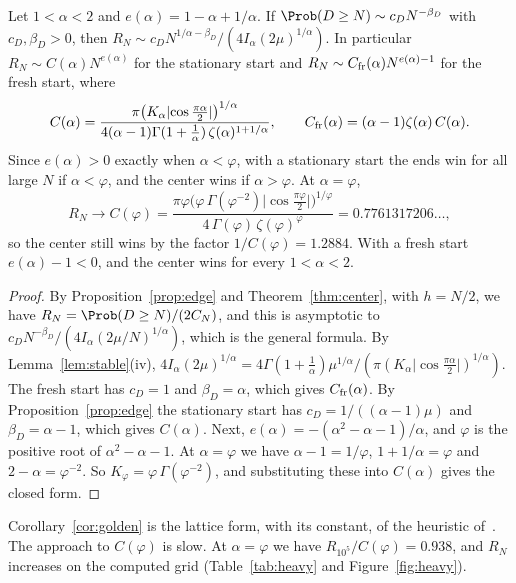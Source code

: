 \begin{corollary}\label{cor:golden}
Let $1<\alpha<2$ and $e(\alpha)=1-\alpha+1/\alpha$. If
$\Prob(D\ge N)\sim c_DN^{-\beta_D}$ with $c_D,\beta_D>0$, then
$R_N\sim c_DN^{1/\alpha-\beta_D}/(4I_\alpha(2\mu)^{1/\alpha})$. In particular
$R_N\sim C(\alpha)N^{e(\alpha)}$ for the stationary start and
$R_N\sim C_{\rm fr}(\alpha)N^{e(\alpha)-1}$ for the fresh start, where
\[
 C(\alpha)=\frac{\pi\bigl(K_\alpha\lvert\cos\frac{\pi\alpha}2\rvert
 \bigr)^{1/\alpha}}{4(\alpha-1)\Gamma(1+\frac1\alpha)\,
 \zeta(\alpha)^{1+1/\alpha}},\qquad
 C_{\rm fr}(\alpha)=(\alpha-1)\zeta(\alpha)\,C(\alpha).
\]
Since $e(\alpha)>0$ exactly when $\alpha<\varphi$, with a stationary start the
ends win for all large $N$ if $\alpha<\varphi$, and the center wins if
$\alpha>\varphi$. At $\alpha=\varphi$,
\[
 R_N\to C(\varphi)=\frac{\pi\varphi\bigl(\varphi\,\Gamma(\varphi^{-2})\lvert
 \cos\frac{\pi\varphi}2\rvert\bigr)^{1/\varphi}}{4\,\Gamma(\varphi)\,
 \zeta(\varphi)^{\varphi}}=0.7761317206\ldots,
\]
so the center still wins by the factor $1/C(\varphi)=1.2884$. With a fresh
start $e(\alpha)-1<0$, and the center wins for every $1<\alpha<2$.
\end{corollary}

\begin{proof}
By Proposition~\ref{prop:edge} and Theorem~\ref{thm:center}, with $h=N/2$, we
have $R_N=\Prob(D\ge N)/(2C_N)$, and this is asymptotic to
$c_DN^{-\beta_D}/(4I_\alpha(2\mu/N)^{1/\alpha})$, which is the general formula.
By Lemma~\ref{lem:stable}(iv),
$4I_\alpha(2\mu)^{1/\alpha}=4\Gamma(1+\frac1\alpha)\mu^{1/\alpha}/(\pi(K_\alpha\lvert\cos\frac{\pi\alpha}2\rvert)^{1/\alpha})$.
The fresh start has $c_D=1$ and $\beta_D=\alpha$, which gives
$C_{\rm fr}(\alpha)$. By Proposition~\ref{prop:edge} the stationary start has
$c_D=1/((\alpha-1)\mu)$ and $\beta_D=\alpha-1$, which gives $C(\alpha)$. Next,
$e(\alpha)=-(\alpha^2-\alpha-1)/\alpha$, and $\varphi$ is the positive root of
$\alpha^2-\alpha-1$. At $\alpha=\varphi$ we have $\alpha-1=1/\varphi$,
$1+1/\alpha=\varphi$ and $2-\alpha=\varphi^{-2}$. So
$K_\varphi=\varphi\,\Gamma(\varphi^{-2})$, and substituting these into
$C(\alpha)$ gives the closed form.
\end{proof}

Corollary~\ref{cor:golden} is the lattice form, with its constant, of the
heuristic of~\cite[Section~2.1]{wlh2016}. The approach to $C(\varphi)$ is
slow. At $\alpha=\varphi$ we have $R_{10^5}/C(\varphi)=0.938$, and $R_N$
increases on the computed grid (Table~\ref{tab:heavy} and
Figure~\ref{fig:heavy}).

